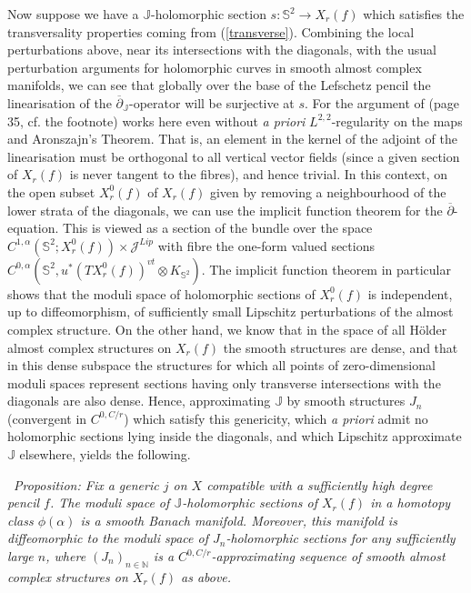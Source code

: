 \documentclass[10pt]{article}
\newcommand{\sss}{\mathbb{S}}
\newcommand{\nn}{\mathbb{N}}
\newcommand{\cdbar}{\overline{\partial}}
\newcounter{Universal}[section]
\renewcommand{\theUniversal}{\thesection.\arabic{Universal}}
\newenvironment{Italic}{\refstepcounter{Universal} \par \vspace{0.5cm}
\noindent {\bf (\theUniversal)}\ \it}{\par \vspace{0.5cm}}
\newenvironment{Prop}{\begin{Italic}{\sc Proposition:} }{\end{Italic}}
\begin{document}
\vspace{0.2cm}

\noindent Now suppose we have a $\mathbb{J}$-holomorphic section $s:
\sss^2 \rightarrow X_r(f)$ 
which satisfies the transversality properties coming from
(\ref{transverse}).  Combining the local perturbations above,
near its intersections with the diagonals, with
the usual perturbation arguments for holomorphic curves in smooth
almost complex manifolds, we can see that globally over the base of the
Lefschetz pencil the linearisation of the
$\cdbar_{\mathbb{J}}$-operator will be surjective at $s$.  For the argument
of \cite{McD-S:Jhol} (page 35, cf. the footnote) works here even
without \emph{a priori} $L^{2,2}$-regularity on the maps and
Aronszajn's Theorem.  That is, an element
in the kernel of the adjoint of the linearisation must be orthogonal
to all vertical vector fields (since a given
section of $X_r(f)$ is never tangent to the fibres), and hence
trivial.  In this context, on the open subset $X^0_r(f)$ of $X_r(f)$
given by removing a neighbourhood of the
lower strata of the diagonals, we 
can use the implicit function theorem for the
$\cdbar$-equation.  This is viewed as a section of the bundle over the space
$C^{1,\alpha}(\sss^2; X^0_r(f)) \times \mathcal{J}^{Lip}$ with fibre 
the one-form valued sections $C^{0, \alpha}(\sss^2, u^* (TX^0_r(f))^{vt}
\otimes K_{\sss^2})$.  The implicit function theorem in particular
shows that the moduli space of holomorphic sections of $X_r^0(f)$ is
independent, up to diffeomorphism, of sufficiently small Lipschitz
perturbations of the almost complex structure.  On the other hand, we
know that in the space of all H\"older almost complex structures on
$X_r(f)$ the smooth structures are dense, and that in this dense
subspace the structures for which all points of zero-dimensional
moduli spaces represent sections having only transverse intersections
with the diagonals are also dense.  Hence, approximating $\mathbb{J}$
by smooth structures $J_n$ (convergent in $C^{0, C/r}$) which satisfy
this genericity, which
\emph{a priori} admit no holomorphic sections lying inside the
diagonals, and which Lipschitz approximate $\mathbb{J}$ elsewhere,
yields the following. 

\begin{Prop}
Fix a generic $j$ on $X$ compatible with a sufficiently high degree
pencil $f$.  The moduli space of $\mathbb{J}$-holomorphic sections of
$X_r(f)$ in a homotopy class $\phi(\alpha)$ is a smooth Banach
manifold.  Moreover, this manifold is diffeomorphic to the moduli
space of $J_n$-holomorphic sections for any sufficiently large $n$,
where $(J_n)_{n \in \nn}$ is a $C^{0, C/r}$-approximating sequence of smooth
almost complex structures on $X_r(f)$ as above. 
\end{Prop}
\end{document}

